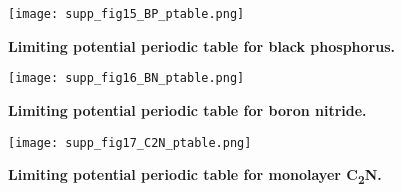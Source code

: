 \begin{figure}[htbp]
  \centering
  \texttt{[image: supp\_fig15\_BP\_ptable.png]}
  \caption{\textbf{Limiting potential periodic table for black phosphorus.}}
  \label{supp_fig15:BP_ptable}
\end{figure}

\begin{figure}[htbp]
  \centering
  \texttt{[image: supp\_fig16\_BN\_ptable.png]}
  \caption{\textbf{Limiting potential periodic table for boron nitride.}}
  \label{supp_fig16:BN_ptable}
\end{figure}

\begin{figure}[htbp]
  \centering
  \texttt{[image: supp\_fig17\_C2N\_ptable.png]}
  \caption{\textbf{Limiting potential periodic table for monolayer C\textsubscript{2}N.}}
  \label{supp_fig17:C2N_ptable}
\end{figure}
